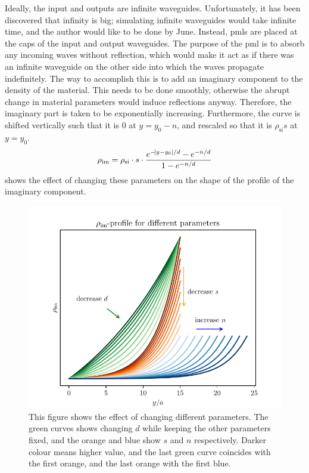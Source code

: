 Ideally, the input and outputs are infinite waveguides.
Unfortunately, it has been discovered that infinity is big; simulating
infinite waveguides would take infinite time, and the author would like to be done by
June.
Instead, \glspl{pml} are placed at the caps of the input and output waveguides.
The purpose of the \gls{pml} is to absorb any incoming waves without reflection,
which would make it act as if there was an infinite waveguide on the other side
into which the waves propagate indefinitely.
The way to accomplish this is to add an imaginary component to the density of
the material.
This needs to be done smoothly, otherwise the abrupt change in material
parameters would induce reflections anyway.
Therefore, the imaginary part is taken to be exponentially increasing.
Furthermore, the curve is shifted vertically such that it is 0 at $y = y_0-n$,
and rescaled so that it is $\rho_\text{si} s$ at $y=y_0$.
\begin{equation}
	\rho_\text{im} = \rho_\text{si} \cdot s \cdot
	\frac{e^{-\abs{y-y_0} / d} - e^{-n/d}}{1 - e^{-n/d}}
\end{equation}
 shows the effect of changing these parameters on the
shape of the profile of the imaginary component.


\begin{figure}[htpb]
	\centering
	\includegraphics{chapters/methods/pml_profile.pdf}
	\caption{%
		This figure shows the effect of changing different parameters.
		The green curves shows changing $d$ while keeping the other parameters
		fixed, and the orange and blue show $s$ and $n$ respectively.
		Darker colour means higher value, and the last green curve coincides
		with the first orange, and the last orange with the first blue.
	}%
	\label{fig:pml_profile}
\end{figure}

